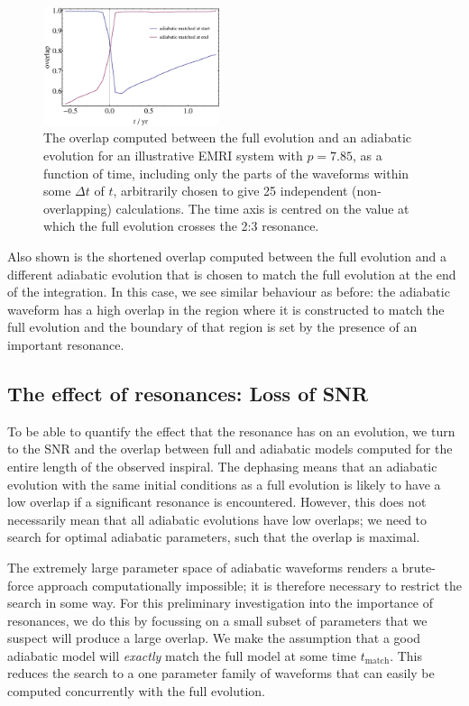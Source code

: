\documentclass[aps,prd,amsfonts,amssymb,amsmath,nofootinbib,reprint,showpacs,superscriptaddress,twocolumn]{revtex4}
\begin{document}
\begin{figure}[htbp]
\centering
\includegraphics[width=0.46\textwidth]{Fig_overlap_vs_time}
\caption{\label{fig:overlap-dephasing}The overlap computed between the full evolution and an adiabatic evolution for an illustrative EMRI system with $p=7.85$, as a function of time, including only the parts of the waveforms within some $\Delta t$ of $t$, arbitrarily chosen to give 25 independent (non-overlapping) calculations. The time axis is centred on the value at which the full evolution crosses the 2:3 resonance.}
\end{figure}

Also shown is the shortened overlap computed between the full evolution and a different adiabatic evolution that is chosen to match the full evolution at the end of the integration. In this case, we see similar behaviour as before: the adiabatic waveform has a high overlap in the region where it is constructed to match the full evolution and the boundary of that region is set by the presence of an important resonance.

\subsection{The effect of resonances: Loss of SNR}
\label{sec:SNRloss}

To be able to quantify the effect that the resonance has on an evolution, we turn to the SNR and the overlap between full and adiabatic models computed for the entire length of the observed inspiral. The dephasing means that an adiabatic evolution with the same initial conditions as a full evolution is likely to have a low overlap if a significant resonance is encountered. However, this does not necessarily mean that all adiabatic evolutions have low overlaps; we need to search for optimal adiabatic parameters, such that the overlap is maximal.

The extremely large parameter space of adiabatic waveforms renders a brute-force approach computationally impossible; it is therefore necessary to restrict the search in some way. For this preliminary investigation into the importance of resonances, we do this by focussing on a small subset of parameters that we suspect will produce a large overlap. We make the assumption that a good adiabatic model will \emph{exactly} match the full model at some time $t_{\mathrm{match}}$. This reduces the search to a one parameter family of waveforms that can easily be computed concurrently with the full evolution.
\end{document}
